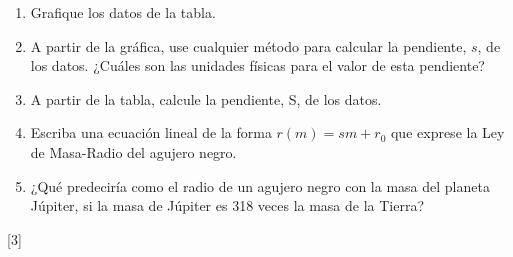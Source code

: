 \documentclass[a4paper]{article}
\newcounter{problema}
\begin{document}
\begin{problema}
\begin{enumerate}
	\item Grafique los datos de la tabla.
	\item A partir de la gráfica, use cualquier método para calcular la pendiente, $s$, de los datos. ¿Cuáles son las unidades físicas para el valor de esta pendiente?
	\item A partir de la tabla, calcule la pendiente, S, de los datos.
	\item Escriba una ecuación lineal de la forma $r(m) = s m + r_0$ que exprese la Ley de Masa-Radio del agujero negro.
	\item ¿Qué predeciría como el radio de un agujero negro con la masa del planeta Júpiter, si la masa de Júpiter es 318 veces la masa de la Tierra?
\end{enumerate}

\end{problema}
[3] \cite{NASA_BlackHoleMath}
\end{document}
